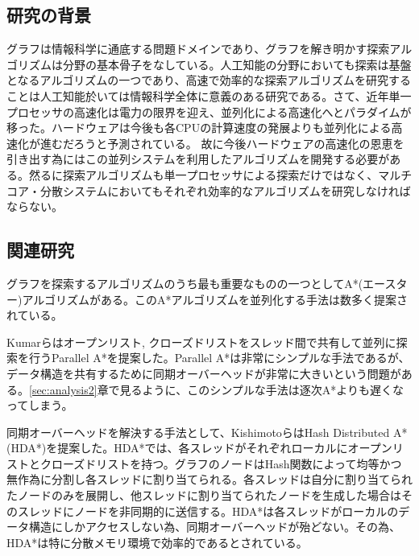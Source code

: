 \documentclass[uplatex]{jsarticle}
\begin{document}
\subsection{研究の背景}
グラフは情報科学に通底する問題ドメインであり、グラフを解き明かす探索アルゴリズムは分野の基本骨子をなしている。人工知能の分野においても探索は基盤となるアルゴリズムの一つであり、高速で効率的な探索アルゴリズムを研究することは人工知能於いては情報科学全体に意義のある研究である。さて、近年単一プロセッサの高速化は電力の限界を迎え、並列化による高速化へとパラダイムが移った。ハードウェアは今後も各CPUの計算速度の発展よりも並列化による高速化が進むだろうと予測されている。
故に今後ハードウェアの高速化の恩恵を引き出す為にはこの並列システムを利用したアルゴリズムを開発する必要がある。然るに探索アルゴリズムも単一プロセッサによる探索だけではなく、マルチコア・分散システムにおいてもそれぞれ効率的なアルゴリズムを研究しなければならない。


\subsection{関連研究}

グラフを探索するアルゴリズムのうち最も重要なものの一つとしてA*(エースター)アルゴリズムがある\cite{Hart1968}。このA*アルゴリズムを並列化する手法は数多く提案されている。
\newline


Kumarらはオープンリスト, クローズドリストをスレッド間で共有して並列に探索を行うParallel A*を提案した。Parallel A*は非常にシンプルな手法であるが、データ構造を共有するために同期オーバーヘッドが非常に大きいという問題がある。\ref{sec:analysis2}章で見るように、このシンプルな手法は逐次A*よりも遅くなってしまう。
\newline

同期オーバーヘッドを解決する手法として、KishimotoらはHash Distributed A* (HDA*)を提案した\cite{Kishimoto2013}。HDA*では、各スレッドがそれぞれローカルにオープンリストとクローズドリストを持つ。グラフのノードはHash関数によって均等かつ無作為に分割し各スレッドに割り当てられる。各スレッドは自分に割り当てられたノードのみを展開し、他スレッドに割り当てられたノードを生成した場合はそのスレッドにノードを非同期的に送信する。HDA*は各スレッドがローカルのデータ構造にしかアクセスしない為、同期オーバーヘッドが殆どない。その為、HDA*は特に分散メモリ環境で効率的であるとされている。
\newline
\end{document}
